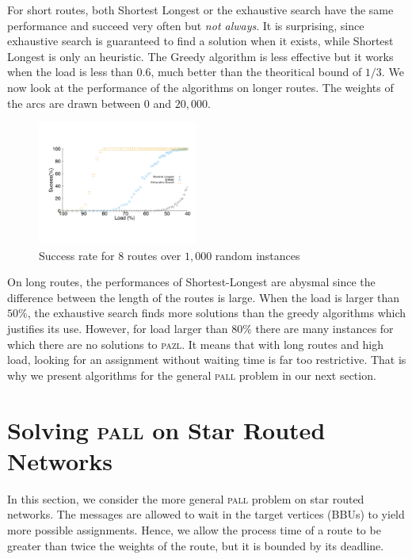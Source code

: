 \documentclass[10pt, conference, letterpaper]{IEEEtran}
\newcommand\pazl{\textsc{pazl}\xspace}
\newcommand\pall{\textsc{pall}\xspace}
\begin{document}
      
      For short routes, both  Shortest Longest or the exhaustive search have the same performance and succeed very often but \emph{not always}. It is surprising, since exhaustive search is guaranteed to find a solution when it exists, while Shortest Longest is only an heuristic. The Greedy algorithm is less effective but it works when the load is less than $0.6$, much better than the theoritical bound of $1/3$. We now look at the performance of the algorithms on longer routes. The weights of the arcs are drawn between $0$ and $20,000$.

   
\begin{figure}[h]

       \begin{center}
      \includegraphics[width=0.47\textwidth]{echec_longues.pdf}
      \end{center}
       
      \caption{Success rate for $8$ routes over $1,000$ random instances}\label{fig:long}
     \end{figure}
     
     On long routes, the performances of Shortest-Longest are abysmal since the difference between the length of the routes is large.
       When the load is larger than $50\%$, the exhaustive search finds more solutions than the greedy algorithms which justifies its use. However, for load larger than $80\%$ there are many instances for which there are no solutions to \pazl.
        It means that with long routes and high load, looking for an assignment without waiting time is far too restrictive. That is why we present algorithms for the general \pall problem in our next section. 
     

         \section{Solving \pall on Star Routed Networks}\label{sec:PALL}
         
    In this section, we consider the more general \pall problem on star routed networks. The messages are allowed to wait in the target vertices (BBUs) to yield more possible assignments. Hence, we allow the process time of a route to be greater than twice the weights of the route, but it is bounded by its deadline.
  
\end{document}
